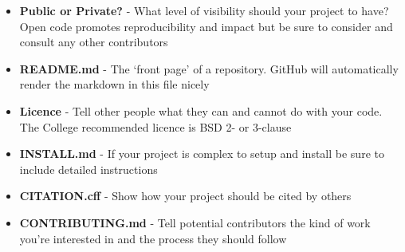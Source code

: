 \documentclass[9pt]{extarticle}
\def\itempad{-1pt}
\begin{document}
\begin{bluebox}[title=Things to think when publishing code]
  \begin{itemize}
    \itemsep\itempad
  \item \textbf{Public or Private?} - What level of visibility should your
    project to have? Open code promotes reproducibility and impact but be sure
    to consider and consult any other contributors
  \item \textbf{README.md} - The `front page' of a repository. GitHub will
    automatically render the markdown in this file nicely
  \item \textbf{Licence} - Tell other people what they can and cannot do with
    your code. The College recommended licence is BSD 2- or 3-clause
  \item \textbf{INSTALL.md} - If your project is complex to setup and install be
    sure to include detailed instructions
  \item \textbf{CITATION.cff} - Show how your project should be cited by others
  \item \textbf{CONTRIBUTING.md} - Tell potential contributors the kind of work
    you're interested in and the process they should follow
  \end{itemize}
\end{bluebox}


\furtherhelp
\end{document}

